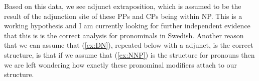\documentclass[12pt, letterpaper]{article}
\begin{document}
\ex Based on this data, we see adjunct extraposition, which is assumed to be the result of the adjunction site of these PPs and CPs being within NP.
	\ea This is a working hypothesis and I am currently looking for further independent evidence that this is is the correct analysis for pronominals in Swedish.
	\z 
\ex Another reason that we can assume that (\ref{ex:DN}), repeated below with a adjunct, is the correct structure, is that if we assume that (\ref{ex:NNP}) is the structure for pronouns then we are left wondering how exactly these pronominal modifiers attach to our structure.
	\ea {}
	\z 
\z 


\end{document}
